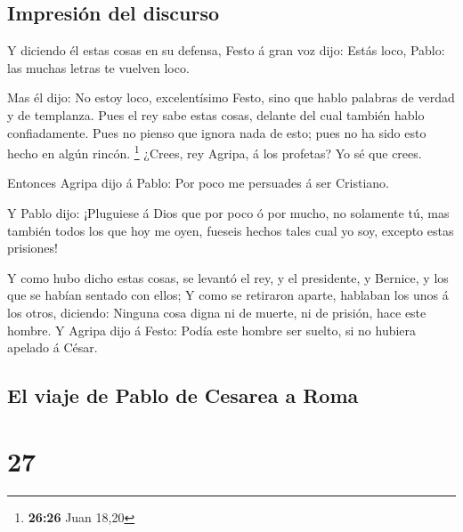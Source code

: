 \hypertarget{impresiuxf3n-del-discurso}{%
\subsection{Impresión del discurso}\label{impresiuxf3n-del-discurso}}

 Y diciendo él estas cosas en su defensa, Festo á gran
voz dijo: Estás loco, Pablo: las muchas letras te vuelven loco.

 Mas él dijo: No estoy loco, excelentísimo Festo, sino
que hablo palabras de verdad y de templanza.  Pues el rey
sabe estas cosas, delante del cual también hablo confiadamente. Pues no
pienso que ignora nada de esto; pues no ha sido esto hecho en algún
rincón. \footnote{\textbf{26:26} Juan 18,20}  ¿Crees, rey
Agripa, á los profetas? Yo sé que crees.

 Entonces Agripa dijo á Pablo: Por poco me persuades á
ser Cristiano.

 Y Pablo dijo: ¡Pluguiese á Dios que por poco ó por
mucho, no solamente tú, mas también todos los que hoy me oyen, fueseis
hechos tales cual yo soy, excepto estas prisiones!

 Y como hubo dicho estas cosas, se levantó el rey, y el
presidente, y Bernice, y los que se habían sentado con ellos;
 Y como se retiraron aparte, hablaban los unos á los
otros, diciendo: Ninguna cosa digna ni de muerte, ni de prisión, hace
este hombre.  Y Agripa dijo á Festo: Podía este hombre
ser suelto, si no hubiera apelado á César.

\hypertarget{el-viaje-de-pablo-de-cesarea-a-roma}{%
\subsection{El viaje de Pablo de Cesarea a
Roma}\label{el-viaje-de-pablo-de-cesarea-a-roma}}

\hypertarget{section-26}{%
\section{27}\label{section-26}}

